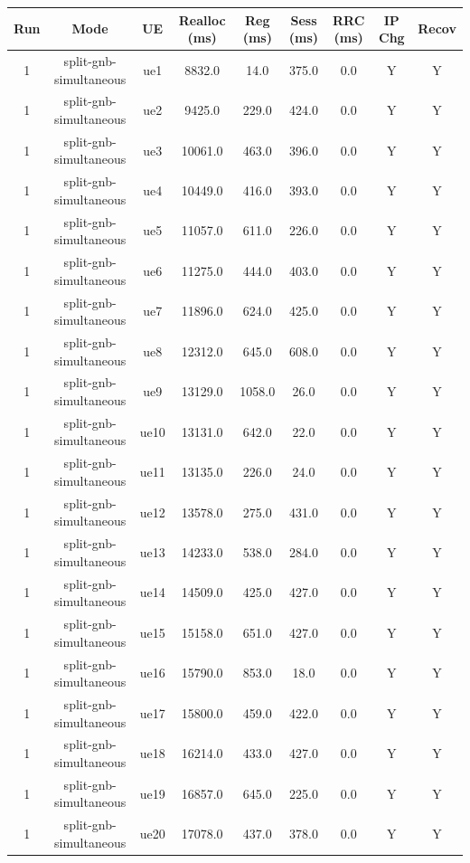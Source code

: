 \begin{table}[ht]
\centering
\begin{tabular}{|c|c|c|c|c|c|c|c|c|}
\hline
Run & Mode & UE & Realloc (ms) & Reg (ms) & Sess (ms) & RRC (ms) & IP Chg & Recov \\
\hline
1 & split-gnb-simultaneous & ue1 & 8832.0 & 14.0 & 375.0 & 0.0 & Y & Y \\
1 & split-gnb-simultaneous & ue2 & 9425.0 & 229.0 & 424.0 & 0.0 & Y & Y \\
1 & split-gnb-simultaneous & ue3 & 10061.0 & 463.0 & 396.0 & 0.0 & Y & Y \\
1 & split-gnb-simultaneous & ue4 & 10449.0 & 416.0 & 393.0 & 0.0 & Y & Y \\
1 & split-gnb-simultaneous & ue5 & 11057.0 & 611.0 & 226.0 & 0.0 & Y & Y \\
1 & split-gnb-simultaneous & ue6 & 11275.0 & 444.0 & 403.0 & 0.0 & Y & Y \\
1 & split-gnb-simultaneous & ue7 & 11896.0 & 624.0 & 425.0 & 0.0 & Y & Y \\
1 & split-gnb-simultaneous & ue8 & 12312.0 & 645.0 & 608.0 & 0.0 & Y & Y \\
1 & split-gnb-simultaneous & ue9 & 13129.0 & 1058.0 & 26.0 & 0.0 & Y & Y \\
1 & split-gnb-simultaneous & ue10 & 13131.0 & 642.0 & 22.0 & 0.0 & Y & Y \\
1 & split-gnb-simultaneous & ue11 & 13135.0 & 226.0 & 24.0 & 0.0 & Y & Y \\
1 & split-gnb-simultaneous & ue12 & 13578.0 & 275.0 & 431.0 & 0.0 & Y & Y \\
1 & split-gnb-simultaneous & ue13 & 14233.0 & 538.0 & 284.0 & 0.0 & Y & Y \\
1 & split-gnb-simultaneous & ue14 & 14509.0 & 425.0 & 427.0 & 0.0 & Y & Y \\
1 & split-gnb-simultaneous & ue15 & 15158.0 & 651.0 & 427.0 & 0.0 & Y & Y \\
1 & split-gnb-simultaneous & ue16 & 15790.0 & 853.0 & 18.0 & 0.0 & Y & Y \\
1 & split-gnb-simultaneous & ue17 & 15800.0 & 459.0 & 422.0 & 0.0 & Y & Y \\
1 & split-gnb-simultaneous & ue18 & 16214.0 & 433.0 & 427.0 & 0.0 & Y & Y \\
1 & split-gnb-simultaneous & ue19 & 16857.0 & 645.0 & 225.0 & 0.0 & Y & Y \\
1 & split-gnb-simultaneous & ue20 & 17078.0 & 437.0 & 378.0 & 0.0 & Y & Y \\

\end{tabular}
\end{table}
